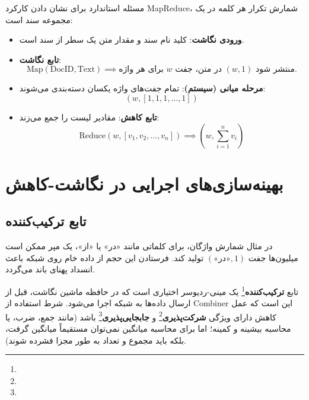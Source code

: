 \begin{example}
مسئله استاندارد برای نشان دادن کارکرد MapReduce، شمارش تکرار هر کلمه در یک مجموعه سند است:
\begin{itemize}
    \item \textbf{ورودی نگاشت}: کلید نام سند و مقدار متن یک سطر از سند است.
    \item \textbf{تابع نگاشت}:
    \begin{equation}
    \text{Map}(\text{DocID}, \text{Text}) \implies \text{برای هر واژه } w \text{ در متن، جفت } (w, 1) \text{ منتشر شود.}
    \end{equation}
    \item \textbf{مرحله میانی (سیستم)}: تمام جفت‌های واژه یکسان دسته‌بندی می‌شوند:
    \begin{equation}
    (w, [1, 1, 1, \dots, 1])
    \end{equation}
    \item \textbf{تابع کاهش}: مقادیر لیست را جمع می‌زند:
    \begin{equation}
    \text{Reduce}(w, [v_1, v_2, \dots, v_n]) \implies \left( w, \sum_{i=1}^n v_i \right)
    \end{equation}
\end{itemize}
\end{example}

\section{بهینه‌سازی‌های اجرایی در نگاشت-کاهش}

\subsection{تابع ترکیب‌کننده \texorpdfstring{}{(Combiner)}}
در مثال شمارش واژگان، برای کلماتی مانند «در» یا «از»، یک مپر ممکن است میلیون‌ها جفت $(\text{«در»}, 1)$ تولید کند. فرستادن این حجم از داده خام روی شبکه باعث انسداد پهنای باند می‌گردد.
\begin{definition}
تابع \textbf{ترکیب‌کننده}\footnote{} یک مینی-ردیوسر اختیاری است که در حافظه ماشین نگاشت، قبل از ارسال داده‌ها به شبکه اجرا می‌شود. شرط استفاده از Combiner این است که عمل کاهش دارای ویژگی \textbf{شرکت‌پذیری}\footnote{} و \textbf{جابجایی‌پذیری}\footnote{} باشد (مانند جمع، ضرب، یا محاسبه بیشینه و کمینه؛ اما برای محاسبه میانگین نمی‌توان مستقیماً میانگین گرفت، بلکه باید مجموع و تعداد به طور مجزا فشرده شوند).
\end{definition}

